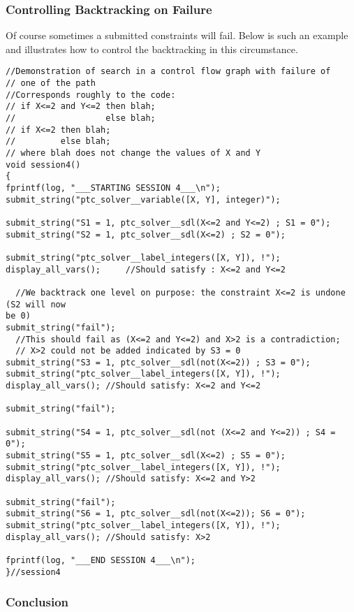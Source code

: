 \documentclass{article}
\begin{document}
\subsubsection{Controlling Backtracking on Failure}

Of course sometimes a submitted constraints will fail. Below is such an example
and
illustrates how to control the backtracking in this circumstance.

\begin{verbatim}
//Demonstration of search in a control flow graph with failure of
// one of the path
//Corresponds roughly to the code:
// if X<=2 and Y<=2 then blah;
//                  else blah;
// if X<=2 then blah;
//         else blah;
// where blah does not change the values of X and Y
void session4()
{
fprintf(log, "___STARTING SESSION 4___\n");
submit_string("ptc_solver__variable([X, Y], integer)");

submit_string("S1 = 1, ptc_solver__sdl(X<=2 and Y<=2) ; S1 = 0");
submit_string("S2 = 1, ptc_solver__sdl(X<=2) ; S2 = 0");

submit_string("ptc_solver__label_integers([X, Y]), !");
display_all_vars();     //Should satisfy : X<=2 and Y<=2

  //We backtrack one level on purpose: the constraint X<=2 is undone (S2 will now
be 0)
submit_string("fail");
  //This should fail as (X<=2 and Y<=2) and X>2 is a contradiction;
  // X>2 could not be added indicated by S3 = 0
submit_string("S3 = 1, ptc_solver__sdl(not(X<=2)) ; S3 = 0");
submit_string("ptc_solver__label_integers([X, Y]), !");
display_all_vars(); //Should satisfy: X<=2 and Y<=2

submit_string("fail");

submit_string("S4 = 1, ptc_solver__sdl(not (X<=2 and Y<=2)) ; S4 = 0");
submit_string("S5 = 1, ptc_solver__sdl(X<=2) ; S5 = 0");
submit_string("ptc_solver__label_integers([X, Y]), !");
display_all_vars(); //Should satisfy: X<=2 and Y>2

submit_string("fail");
submit_string("S6 = 1, ptc_solver__sdl(not(X<=2)); S6 = 0");
submit_string("ptc_solver__label_integers([X, Y]), !");
display_all_vars(); //Should satisfy: X>2

fprintf(log, "___END SESSION 4___\n");
}//session4
\end{verbatim}


\subsubsection{Conclusion}
\end{document}
